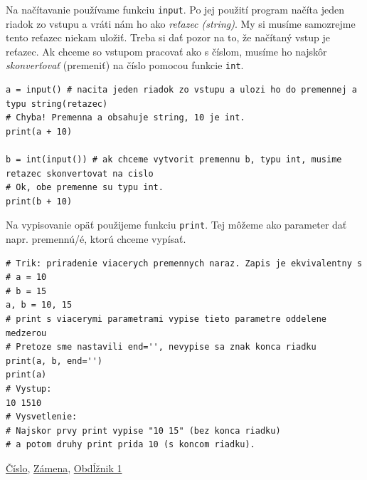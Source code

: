 \documentclass{article}
\begin{document}


Na načítavanie používame funkciu \texttt{input}. Po jej použití program načíta jeden riadok zo vstupu
a vráti nám ho ako \textit{reťazec (string)}. My si musíme samozrejme tento reťazec niekam uložiť. Treba si dať pozor na to, že načítaný vstup je reťazec. Ak chceme so vstupom pracovať ako s číslom, musíme ho najskôr \textit{skonverťovať} (premeniť) na číslo pomocou funkcie \texttt{int}.


\begin{lstlisting}
a = input() # nacita jeden riadok zo vstupu a ulozi ho do premennej a typu string(retazec)
# Chyba! Premenna a obsahuje string, 10 je int.
print(a + 10)

b = int(input()) # ak chceme vytvorit premennu b, typu int, musime retazec skonvertovat na cislo
# Ok, obe premenne su typu int.
print(b + 10)
\end{lstlisting}

Na vypisovanie opäť použijeme funkciu \texttt{print}.
Tej môžeme ako parameter dať napr. premennú/é, ktorú chceme vypísať.

\begin{lstlisting}
# Trik: priradenie viacerych premennych naraz. Zapis je ekvivalentny s
# a = 10
# b = 15
a, b = 10, 15
# print s viacerymi parametrami vypise tieto parametre oddelene medzerou
# Pretoze sme nastavili end='', nevypise sa znak konca riadku
print(a, b, end='')
print(a)
# Vystup:
10 1510
# Vysvetlenie:
# Najskor prvy print vypise "10 15" (bez konca riadku)
# a potom druhy print prida 10 (s koncom riadku).
\end{lstlisting}

\href{https://testovac.ksp.sk/tasks/ls-uvod-cislo/}{Číslo},
\href{https://testovac.ksp.sk/tasks/ls-uvod-zamena/}{Zámena},
\href{https://testovac.ksp.sk/tasks/ls-uvod-obdlznik1/}{Obdĺžnik 1}
\end{document}
